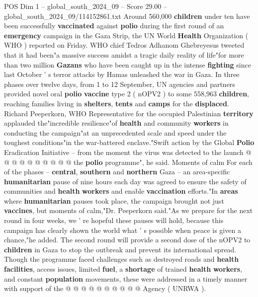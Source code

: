 \begin{textsample}{POS Dim 1 – global\_south\_2024\_09 – Score 29.00 – global\_south\_2024\_09/114152861.txt}  \label{ex:f1_pos_203}
Around 560,000 \textbf{children} under ten have been successfully \textbf{vaccinated} against \textbf{polio} during the first round of an \textbf{emergency} campaign in the Gaza Strip, the UN World \textbf{Health} Organization ( WHO ) reported on Friday.
WHO chief Tedros Adhanom Ghebreyesus tweeted that it had been"a massive success amidst a tragic daily reality of life"for more than two million \textbf{Gazans} who have been caught up in the intense \textbf{fighting} since last October ' s terror attacks by Hamas unleashed the war in Gaza.
In three phases over twelve days, from 1 to 12 September, UN agencies and partners provided novel oral \textbf{polio} \textbf{vaccine} type 2 ( nOPV2 ) to some 558,963 \textbf{children}, reaching families living in \textbf{shelters}, \textbf{tents} and \textbf{camps} for the \textbf{displaced}.
Richard Peeperkorn, WHO Representative for the occupied Palestinian \textbf{territory} applauded the"incredible resilience"of \textbf{health} and community \textbf{workers} in conducting the campaign"at an unprecedented scale and speed under the toughest conditions"in the war-battered enclave."Swift action by the Global \textbf{Polio} Eradication Initiative -- from the moment the virus was detected to the launch @ @ @ @ @ @ @ @ @ @ the \textbf{polio} programme", he said.
Moments of calm For each of the phases -- \textbf{central}, \textbf{southern} and \textbf{northern} Gaza -- an area-specific \textbf{humanitarian} pause of nine hours each day was agreed to ensure the safety of communities and \textbf{health} \textbf{workers} and enable \textbf{vaccination} efforts."In \textbf{areas} where \textbf{humanitarian} pauses took place, the campaign brought not just \textbf{vaccines}, but moments of calm,"Dr.
Peeperkorn said."As we prepare for the next round in four weeks, we ' re hopeful these pauses will hold, because this campaign has clearly shown the world what ' s possible when peace is given a chance,"he added.
The second round will provide a second dose of the nOPV2 to \textbf{children} in Gaza to stop the outbreak and prevent its international spread.
Though the programme faced challenges such as destroyed roads and \textbf{health} \textbf{facilities}, access issues, limited \textbf{fuel}, a \textbf{shortage} of trained \textbf{health} \textbf{workers}, and constant \textbf{population} movements, these were addressed in a timely manner with support of the @ @ @ @ @ @ @ @ @ @ Agency ( UNRWA ).

\end{textsample}
